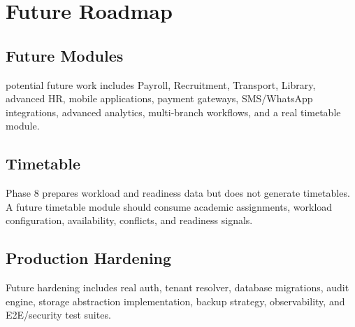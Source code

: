 \chapter{Future Roadmap}
\section{Future Modules}
\statusfuture{} potential future work includes Payroll, Recruitment, Transport, Library, advanced HR, mobile applications, payment gateways, SMS/WhatsApp integrations, advanced analytics, multi-branch workflows, and a real timetable module.

\section{Timetable}
Phase 8 prepares workload and readiness data but does not generate timetables. A future timetable module should consume academic assignments, workload configuration, availability, conflicts, and readiness signals.

\section{Production Hardening}
Future hardening includes real auth, tenant resolver, database migrations, audit engine, storage abstraction implementation, backup strategy, observability, and E2E/security test suites.
